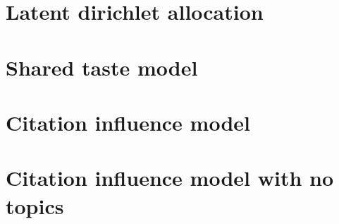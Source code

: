 \documentclass[a4paper]{article}
\begin{document}
\section{Latent dirichlet allocation}


\section{Shared taste model}


\section{Citation influence model}


\section{Citation influence model with no topics}

\end{document}
